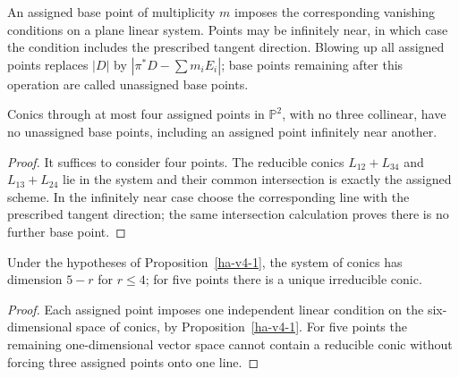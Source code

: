 \begin{definition}
An assigned base point of multiplicity $m$ imposes the corresponding vanishing
conditions on a plane linear system.  Points may be infinitely near, in which
case the condition includes the prescribed tangent direction.  Blowing up all
assigned points replaces $|D|$ by
$|\pi^*D-\sum m_iE_i|$; base points remaining after this operation are called
unassigned base points.
\end{definition}

\begin{proposition}
\label{ha-v4-1}
Conics through at most four assigned points in \(\mathbb P^2\), with no three
collinear, have no unassigned base points, including an assigned point infinitely
near another.

\end{proposition}
\begin{proof}
It suffices to consider four points.  The reducible conics
\(L_{12}+L_{34}\) and \(L_{13}+L_{24}\) lie in the system and their common
intersection is exactly the assigned scheme.  In the infinitely near case choose
the corresponding line with the prescribed tangent direction; the same
intersection calculation proves there is no further base point.
\end{proof}

\begin{corollary}
\label{ha-v4-2}
Under the hypotheses of Proposition~\ref{ha-v4-1}, the system of conics has
dimension \(5-r\) for \(r\le4\); for five points there is a unique irreducible
conic.
\end{corollary}
\begin{proof}
Each assigned point imposes one independent linear condition on the six-dimensional
space of conics, by Proposition~\ref{ha-v4-1}.  For five points the remaining
one-dimensional vector space cannot contain a reducible conic without forcing
three assigned points onto one line.
\end{proof}

